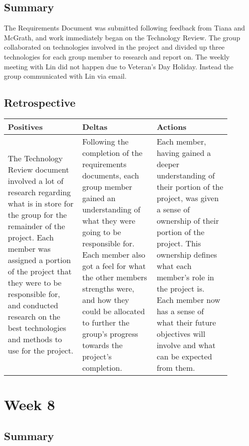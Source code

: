 \documentclass[letterpaper,10pt,serif,draftclsnofoot,onecolumn,compsoc,titlepage]{IEEEtran}
\begin{document}
\subsection{Summary}

The Requirements Document was submitted following feedback from Tiana and McGrath, 
and work immediately began on the Technology Review. The group collaborated on 
technologies involved in the project and divided up three technologies for each 
group member to research and report on. The weekly meeting with Lin did not happen 
due to Veteran's Day Holiday. Instead the group communicated with Lin via email. \\

\subsection{Retrospective}

\begin{tabular}{|p{0.3\linewidth}|p{0.3\linewidth}|p{0.3\linewidth}|}
   \hline
   \textbf{Positives} & \textbf{Deltas} & \textbf{Actions}\\ 
   \hline
   The Technology Review document involved a lot of research regarding what is in 
   store for the group for the remainder of the project. Each member was assigned a portion of the project that they were to be responsible for, and conducted research on the best technologies and methods to use for the project. 
   & 
   Following the completion of the requirements documents, each group member gained an understanding of what they were going to be responsible for. Each member also got a feel for what the other members strengths were, and how they could be allocated to further the group's progress towards the project's completion.
   & 
   Each member, having gained a deeper understanding of their portion of the project, was given a sense of ownership of their portion of the project. This ownership defines what each member's role in the project is. Each member now has a sense of what their future objectives will involve and what can be expected from them.
   \\
   \hline
\end{tabular}

\section{Week 8}

\subsection{Summary}
\end{document}
